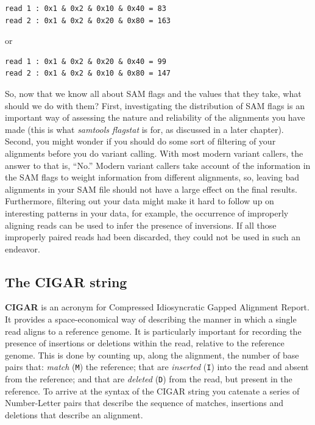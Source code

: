 \documentclass[]{krantz}
\begin{document}
\begin{verbatim}
read 1 : 0x1 & 0x2 & 0x10 & 0x40 = 83
read 2 : 0x1 & 0x2 & 0x20 & 0x80 = 163
\end{verbatim}

or

\begin{verbatim}
read 1 : 0x1 & 0x2 & 0x20 & 0x40 = 99
read 2 : 0x1 & 0x2 & 0x10 & 0x80 = 147
\end{verbatim}

So, now that we know all about SAM flags and the values that they take,
what should we do with them? First, investigating the distribution of
SAM flags is an important way of assessing the nature and reliability of
the alignments you have made (this is what \emph{samtools flagstat} is for, as discussed
in a later chapter). Second, you might wonder if you should do some sort
of filtering of your alignments before you do variant calling. With most modern
variant callers, the answer to that is, ``No.'' Modern variant callers take account of
the information in the SAM flags to weight information from different alignments, so,
leaving bad alignments in your SAM file should not have a large effect on the final
results. Furthermore, filtering out your data might make it hard to follow up on interesting patterns in
your data, for example, the occurrence of improperly aligning reads can be used to
infer the presence of inversions. If all those improperly paired reads had been discarded,
they could not be used in such an endeavor.

\hypertarget{the-cigar-string}{%
\subsection{The CIGAR string}\label{the-cigar-string}}

\textbf{CIGAR} is an acronym for Compressed Idiosyncratic Gapped Alignment Report. It provides a
space-economical way of describing the manner in which a single read aligns to a reference
genome. It is particularly important for recording the presence of insertions or deletions within
the read, relative to the reference genome. This is done by counting up, along the alignment, the
number of base pairs that: \emph{match} (\texttt{M}) the reference; that are \emph{inserted} (\texttt{I}) into the read and
absent from the reference; and that are \emph{deleted} (\texttt{D}) from the read, but present in the reference.
To arrive at the syntax of the CIGAR string you catenate a series of Number-Letter pairs that describe the
sequence of matches, insertions and deletions that describe an alignment.
\end{document}
